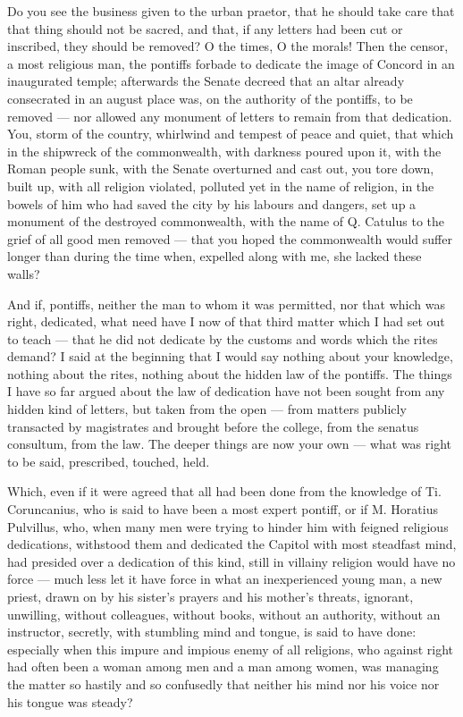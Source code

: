 Do you see the business given to the urban praetor, that he should take care that that thing should not be sacred, and that, if any letters had been cut or inscribed, they should be removed? O the times, O the morals! Then the censor, a most religious man, the pontiffs forbade to dedicate the image of Concord in an inaugurated temple; afterwards the Senate decreed that an altar already consecrated in an august place was, on the authority of the pontiffs, to be removed --- nor allowed any monument of letters to remain from that dedication. You, storm of the country, whirlwind and tempest of peace and quiet, that which in the shipwreck of the commonwealth, with darkness poured upon it, with the Roman people sunk, with the Senate overturned and cast out, you tore down, built up, with all religion violated, polluted yet in the name of religion, in the bowels of him who had saved the city by his labours and dangers, set up a monument of the destroyed commonwealth, with the name of Q. Catulus to the grief of all good men removed --- that you hoped the commonwealth would suffer longer than during the time when, expelled along with me, she lacked these walls?

 And if, pontiffs, neither the man to whom it was permitted, nor that which was right, dedicated, what need have I now of that third matter which I had set out to teach --- that he did not dedicate by the customs and words which the rites demand? I said at the beginning that I would say nothing about your knowledge, nothing about the rites, nothing about the hidden law of the pontiffs. The things I have so far argued about the law of dedication have not been sought from any hidden kind of letters, but taken from the open --- from matters publicly transacted by magistrates and brought before the college, from the senatus consultum, from the law. The deeper things are now your own --- what was right to be said, prescribed, touched, held.

 Which, even if it were agreed that all had been done from the knowledge of Ti. Coruncanius, who is said to have been a most expert pontiff, or if M. Horatius Pulvillus, who, when many men were trying to hinder him with feigned religious dedications, withstood them and dedicated the Capitol with most steadfast mind, had presided over a dedication of this kind, still in villainy religion would have no force --- much less let it have force in what an inexperienced young man, a new priest, drawn on by his sister's prayers and his mother's threats, ignorant, unwilling, without colleagues, without books, without an authority, without an instructor, secretly, with stumbling mind and tongue, is said to have done: especially when this impure and impious enemy of all religions, who against right had often been a woman among men and a man among women, was managing the matter so hastily and so confusedly that neither his mind nor his voice nor his tongue was steady?

